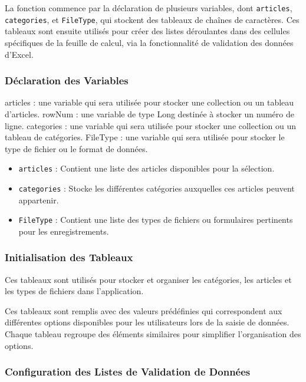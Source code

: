 \documentclass[a4paper, oneside, 12pt, final]{extreport}
\begin{document}
La fonction commence par la déclaration de plusieurs variables, dont \texttt{articles}, \texttt{categories}, et \texttt{FileType}, qui stockent des tableaux de chaînes de caractères. Ces tableaux sont ensuite utilisés pour créer des listes déroulantes dans des cellules spécifiques de la feuille de calcul, via la fonctionnalité de validation des données d'Excel.

\subsubsection{Déclaration des Variables}

articles : une variable qui sera utilisée pour stocker une collection ou un tableau d'articles.
rowNum : une variable de type Long destinée à stocker un numéro de ligne.
categories : une variable qui sera utilisée pour stocker une collection ou un tableau de catégories.
FileType : une variable qui sera utilisée pour stocker le type de fichier ou le format de données.


\begin{itemize}
    \item \texttt{articles} : Contient une liste des articles disponibles pour la sélection.
    \item \texttt{categories} : Stocke les différentes catégories auxquelles ces articles peuvent appartenir.
    \item \texttt{FileType} : Contient une liste des types de fichiers ou formulaires pertinents pour les enregistrements.
\end{itemize}

\subsubsection{Initialisation des Tableaux}

Ces tableaux sont utilisés pour stocker et organiser les catégories, les articles et les types de fichiers dans l'application.

Ces tableaux sont remplis avec des valeurs prédéfinies qui correspondent aux différentes options disponibles pour les utilisateurs lors de la saisie de données. Chaque tableau regroupe des éléments similaires pour simplifier l'organisation des options.

\subsubsection{Configuration des Listes de Validation de Données}
\end{document}
